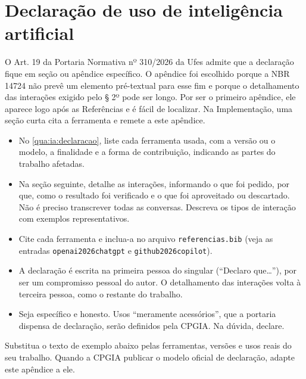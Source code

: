 \chapter{Declaração de uso de inteligência artificial}
\label{ap:ia}

\begin{instrucao}
O Art. 19 da Portaria Normativa nº 310/2026 da Ufes \cite{ufes2026portaria}
admite que a declaração fique em seção ou apêndice específico. O apêndice foi
escolhido porque a NBR 14724 não prevê um elemento pré-textual para esse fim e
porque o detalhamento das interações exigido pelo § 2º pode ser longo. Por ser
o primeiro apêndice, ele aparece logo após as Referências e é fácil de
localizar. Na Implementação, uma seção curta cita a ferramenta e remete a este
apêndice.

\begin{itemize}
  \item No \cref{qua:ia:declaracao}, liste cada ferramenta usada, com a versão
        ou o modelo, a finalidade e a forma de contribuição, indicando as
        partes do trabalho afetadas.
  \item Na seção seguinte, detalhe as interações, informando o que foi pedido,
        por que, como o resultado foi verificado e o que foi aproveitado ou
        descartado.
        Não é preciso transcrever todas as conversas. Descreva os tipos de
        interação com exemplos representativos.
  \item Cite cada ferramenta e inclua-a no arquivo \verb|referencias.bib|
        (veja as entradas \verb|openai2026chatgpt| e \verb|github2026copilot|).
  \item A declaração é escrita na primeira pessoa do singular (``Declaro
        que\ldots''), por ser um compromisso pessoal do autor. O detalhamento
        das interações volta à terceira pessoa, como o restante do trabalho.
  \item Seja específico e honesto. Usos ``meramente acessórios'', que a
        portaria dispensa de declaração, serão definidos pela CPGIA. Na dúvida,
        declare.
\end{itemize}
Substitua o texto de exemplo abaixo pelas ferramentas, versões e usos reais
do seu trabalho. Quando a CPGIA publicar o modelo oficial de declaração,
adapte este apêndice a ele.
\end{instrucao}

